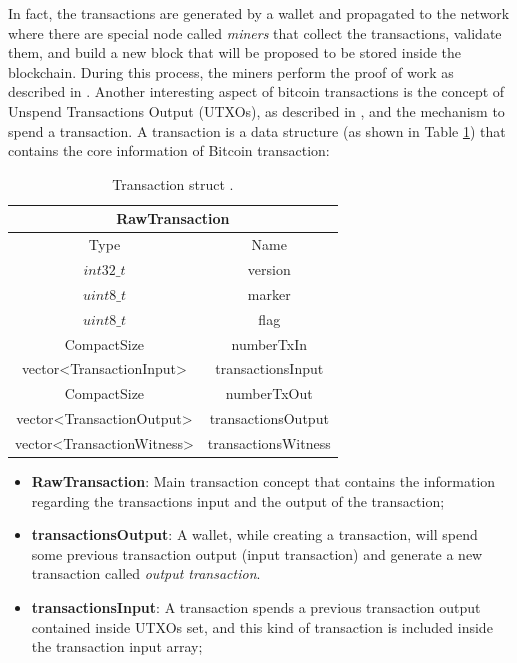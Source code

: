In fact, the transactions are generated by a wallet and propagated to the network
where there are special node called \emph{miners} that collect the transactions,
validate them, and build a new block that will be proposed to be stored inside 
the blockchain. During this process, the miners perform the proof of work as 
described in \cite{Palazzo_Estrazione_di_Informazioni_2021}.
Another interesting aspect of bitcoin transactions is the concept of 
Unspend Transactions Output (UTXOs), as described in \cite{nakamoto2009bitcoin},
and the mechanism to spend a transaction.
A transaction is a data structure (as shown in Table \ref{tab:rawtxbitcoinc}) that contains the core information
of Bitcoin transaction: 

\begin{table}[H]
    \centering\small
       \begin{tabular}{|c|c|}
        \hline
        \multicolumn{2}{|c|}{\textbf{RawTransaction}} \\
        \hline
        \multicolumn{1}{|c|}{Type} & \multicolumn{1}{c|}{Name} \\       
        \hline \hline
        $int32\_t$ & version   \\
        \hline
        $uint8\_t$ & marker \\
        \hline
        $uint8\_t$ & flag \\
        \hline
        CompactSize & numberTxIn \\
        \hline
        vector<TransactionInput> & transactionsInput \\
        \hline
        CompactSize & numberTxOut \\
        \hline
        vector<TransactionOutput> & transactionsOutput \\
        \hline
        vector<TransactionWitness> & transactionsWitness \\
        \hline
    \end{tabular}   
    \caption{Transaction struct \cite{Palazzo_Estrazione_di_Informazioni_2021}.\label{tab:rawtxbitcoinc}}
\end{table}

\begin{itemize}
    \item {\bf RawTransaction}: Main transaction concept that contains the information
        regarding the transactions input and the output of the transaction;
    \item {\bf transactionsOutput}: A wallet, while creating a transaction, will spend some previous
        transaction output (input transaction) and generate a new transaction called \emph{output transaction}.
    \item {\bf transactionsInput}: A transaction spends a previous transaction output contained
        inside UTXOs set, and this kind of transaction is included inside
        the transaction input array;
    \end{itemize}


